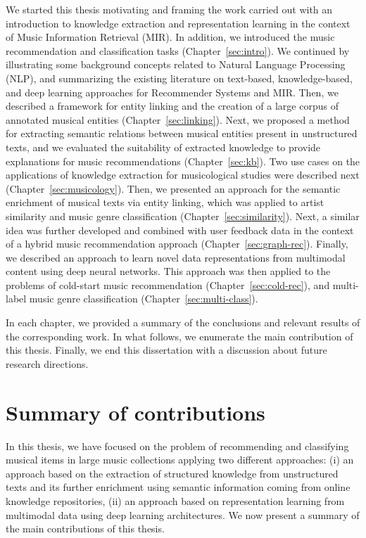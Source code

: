 We started this thesis motivating and framing the work carried out with an introduction to knowledge extraction and representation learning in the context of Music Information Retrieval (MIR). In addition, we introduced the music recommendation and classification tasks (Chapter~\ref{sec:intro}). We continued by illustrating some background concepts related to Natural Language Processing (NLP), and summarizing the existing literature on text-based, knowledge-based, and deep learning approaches for Recommender Systems and MIR. Then, we described a framework for entity linking and the creation of a large corpus of annotated musical entities (Chapter~\ref{sec:linking}). Next, we proposed a method for extracting semantic relations between musical entities present in unstructured texts, and we evaluated the suitability of extracted knowledge to provide explanations for music recommendations (Chapter~\ref{sec:kb}). Two use cases on the applications of knowledge extraction for musicological studies were described next (Chapter~\ref{sec:musicology}). Then, we presented an approach for the semantic enrichment of musical texts via entity linking, which was applied to artist similarity and music genre classification (Chapter~\ref{sec:similarity}). Next, a similar idea was further developed and combined with user feedback data in the context of a hybrid music recommendation approach (Chapter~\ref{sec:graph-rec}). Finally, we described an approach to learn novel data representations from multimodal content using deep neural networks. This approach was then applied to the problems of cold-start music recommendation (Chapter~\ref{sec:cold-rec}), and multi-label music genre classification (Chapter~\ref{sec:multi-class}).

In each chapter, we provided a summary of the conclusions and relevant results of the corresponding work. In what follows, we enumerate the main contribution of this thesis. Finally, we end this dissertation with a discussion about future research directions.

\section{Summary of contributions}
\label{sec:conclusion:summary}

In this thesis, we have focused on the problem of recommending and classifying musical items in large music collections applying two different approaches: (i) an approach based on the extraction of structured knowledge from unstructured texts and its further enrichment using semantic information coming from online knowledge repositories, (ii) an approach based on representation learning from multimodal data using deep learning architectures. We now present a summary of the main contributions of this thesis.


